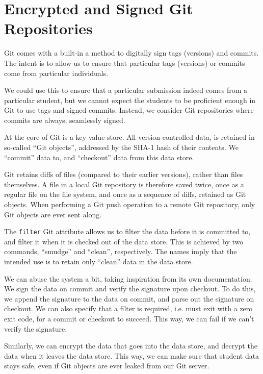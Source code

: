
\section{Encrypted and Signed Git Repositories}

Git comes with a built-in a method to digitally sign tags (versions) and
commits. The intent is to allow us to ensure that particular tags (versions) or
commits come from particular individuals\cite{gerwitz-2013}.

We could use this to ensure that a particular submission indeed comes from a
particular student, but we cannot expect the students to be proficient enough
in Git to use tags and signed commits. Instead, we consider Git repositories
where commits are always, seamlessly signed.

At the core of Git is a key-value store\cite{chacon-2009}. All
version-controlled data, is retained in so-called ``Git objects'', addressed by
the SHA-1 hash of their contents. We ``commit'' data to, and ``checkout'' data
from this data store.

Git retains diffs of files (compared to their earlier versions), rather than
files themselves. A file in a local Git repository is therefore saved twice,
once as a regular file on the file system, and once as a sequence of diffs,
retained as Git objects. When performing a Git push operation to a remote Git
repository, only Git objects are ever sent along.

The \texttt{filter} Git attribute \cite{man-5-gitattributes} allows us to
filter the data before it is committed to, and filter it when it is checked out
of the data store. This is achieved by two commands, ``smudge'' and ``clean'',
respectively. The names imply that the intended use is to retain only ``clean''
data in the data store.

We can abuse the system a bit, taking inspiration from its own
documentation\cite{man-5-gitattributes}. We sign the data on commit and verify
the signature upon checkout. To do this, we append the signature to the data on
commit, and parse out the signature on checkout. We can also specify that a
filter is required, i.e.  must exit with a zero exit code, for a commit or
checkout to succeed. This way, we can fail if we can't verify the signature.

Similarly, we can encrypt the data that goes into the data store, and decrypt
the data when it leaves the data store. This way, we can make sure that student
data stays safe, even if Git objects are ever leaked from our Git server.

